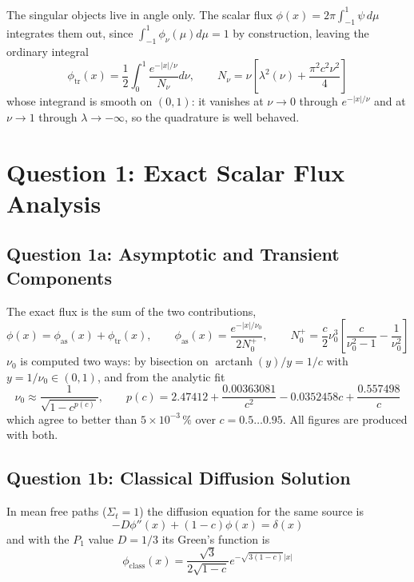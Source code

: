 \documentclass[11pt]{article}
\begin{document}
The singular objects live in angle only. The scalar flux $\phi(x) = 2\pi\int_{-1}^1 \psi \,d\mu$ integrates them out, since $\int_{-1}^1 \phi_\nu(\mu)d\mu = 1$ by construction, leaving the ordinary integral
\begin{equation}
    \phi_{\text{tr}}(x) = \frac{1}{2} \int_0^1 \frac{e^{-|x|/\nu}}{N_\nu} d\nu,
    \qquad
    N_\nu = \nu \left[ \lambda^2(\nu) + \frac{\pi^2 c^2 \nu^2}{4} \right]
\end{equation}
whose integrand is smooth on $(0,1)$: it vanishes at $\nu \to 0$ through $e^{-|x|/\nu}$ and at $\nu \to 1$ through $\lambda \to -\infty$, so the quadrature is well behaved.

\section*{Question 1: Exact Scalar Flux Analysis}
\subsection*{Question 1a: Asymptotic and Transient Components}

The exact flux is the sum of the two contributions,
\begin{equation}
    \phi(x) = \phi_{\text{as}}(x) + \phi_{\text{tr}}(x),
    \qquad
    \phi_{\text{as}}(x) = \frac{e^{-|x|/\nu_0}}{2 N_0^+},
    \qquad
    N_0^+ = \frac{c}{2} \nu_0^3 \left[ \frac{c}{\nu_0^2 - 1} - \frac{1}{\nu_0^2} \right]
\end{equation}
$\nu_0$ is computed two ways: by bisection on $\operatorname{arctanh}(y)/y = 1/c$ with $y = 1/\nu_0 \in (0,1)$, and from the analytic fit
\begin{equation}
    \nu_0 \approx \frac{1}{\sqrt{1 - c^{p(c)}}},
    \qquad
    p(c) = 2.47412 + \frac{0.00363081}{c^2} - 0.0352458c + \frac{0.557498}{c}
\end{equation}
which agree to better than $5 \times 10^{-3}\,\%$ over $c = 0.5 \ldots 0.95$. All figures are produced with both.

\subsection*{Question 1b: Classical Diffusion Solution}

In mean free paths ($\Sigma_t = 1$) the diffusion equation for the same source is
\begin{equation}
    - D \phi''(x) + (1 - c) \phi(x) = \delta(x)
\end{equation}
and with the $P_1$ value $D = 1/3$ its Green's function is
\begin{equation}
    \phi_{\text{class}}(x) = \frac{\sqrt{3}}{2\sqrt{1-c}} e^{-\sqrt{3(1-c)} |x|}
\end{equation}
\end{document}

